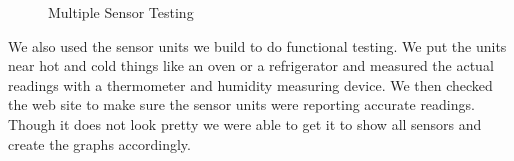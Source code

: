 \documentclass{report}
\begin{document}
\begin{figure}[H]
	\caption{Multiple Sensor Testing}
\end{figure}
\indent
We also used the sensor units we build to do functional testing. We put the units near hot and cold things like an oven or a refrigerator and measured the actual readings with a thermometer and humidity measuring device. We then checked the web site to make sure the sensor units were reporting accurate readings. Though it does not look pretty we were able to get it to show all sensors and create the graphs accordingly.
\newpage
\end{document}
